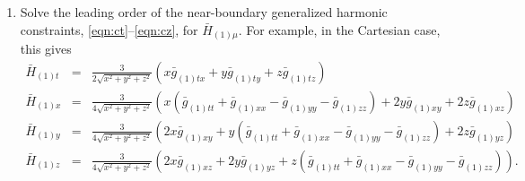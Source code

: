 \documentclass[a4paper,11pt]{article}
\numberwithin{equation}{section}
\begin{document}
\begin{enumerate}
\item Solve the leading order of the near-boundary generalized harmonic constraints, \eqref{eqn:ct}--\eqref{eqn:cz}, for $\bar{H}_{(1)\mu}$. For example, in the Cartesian case, this gives
\begin{eqnarray}\label{eqn:target_gauge_txyz_step1}
\bar{H}_{(1)t}&=&\frac{3}{2\sqrt{x^2+y^2+z^2}}(x \bar{g}_{(1)tx}+y\bar{g}_{(1)ty}+z\bar{g}_{(1)tz}) \\
\bar{H}_{(1)x}&=&\frac{3}{4\sqrt{x^2+y^2+z^2}}(x(\bar{g}_{(1)tt}+ \bar{g}_{(1)xx}-\bar{g}_{(1)yy}-\bar{g}_{(1)zz})+2y \bar{g}_{(1)xy}+2z \bar{g}_{(1)xz}) \nonumber \\
\bar{H}_{(1)y}&=&\frac{3}{4\sqrt{x^2+y^2+z^2}}(2x \bar{g}_{(1)xy}+y(\bar{g}_{(1)tt}+ \bar{g}_{(1)xx}-\bar{g}_{(1)yy}-\bar{g}_{(1)zz})+2z \bar{g}_{(1)yz}) \nonumber \\
\bar{H}_{(1)z}&=&\frac{3}{4\sqrt{x^2+y^2+z^2}}(2x \bar{g}_{(1)xz}+2y \bar{g}_{(1)yz}+z(\bar{g}_{(1)tt}+ \bar{g}_{(1)xx}-\bar{g}_{(1)yy}-\bar{g}_{(1)zz})). \nonumber 
\end{eqnarray}



\end{enumerate}
\end{document}
